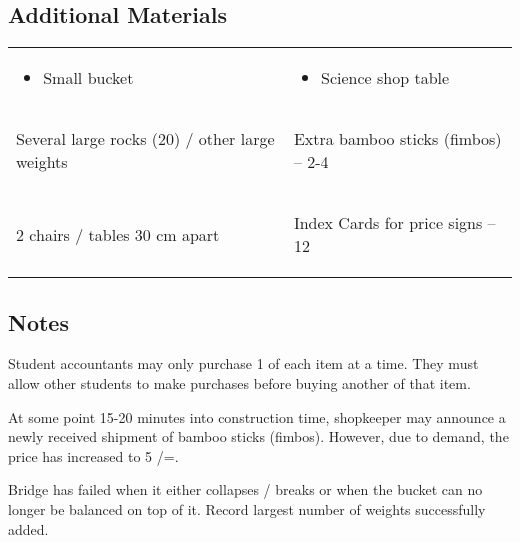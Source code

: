 \subsection{Additional Materials}
\begin{tabular}{p{} p{}} \\[-30pt]
\begin{itemize}
\item Small bucket 		
\end{itemize}	& \begin{itemize}
\item Science shop table
\end{itemize}\\[-30pt]
\begin{itemize*}
\item Several large rocks (20) / other large weights 		
\end{itemize*}	& \begin{itemize*}
\item Extra bamboo sticks (fimbos) – 2-4
\end{itemize*}\\[-30pt]
\begin{itemize*}
\item 2 chairs / tables 30 cm apart		
\end{itemize*}	& \begin{itemize*}
\item Index Cards for price signs – 12
\end{itemize*}\\[-10pt]
\end{tabular}

\subsection{Notes}
\begin{itemize*}
\item Student accountants may only purchase 1 of each item at a time. They must allow other students to make purchases before buying another of that item.
\item At some point 15-20 minutes into construction time, shopkeeper may announce a newly received shipment of bamboo sticks (fimbos). However, due to demand, the price has increased to 5 /=.
\item Bridge has failed when it either collapses / breaks or when the bucket can no longer be balanced on top of it. Record largest number of weights successfully added.
\end{itemize*}


